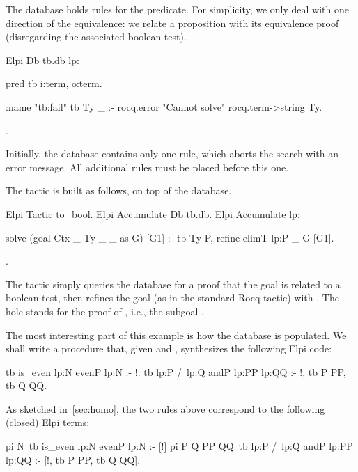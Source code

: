 \documentclass[a4paper, 11pt]{book}
\begin{document}
The database holds rules for the  predicate. For simplicity, we only
deal with one direction of the equivalence: we relate a proposition with its
equivalence proof (disregarding the associated boolean test).

\begin{rocqcode}
Elpi Db tb.db lp:{{

pred tb i:term, o:term.

:name "tb:fail"
tb Ty _ :- rocq.error "Cannot solve" {rocq.term->string Ty}.

}}.
\end{rocqcode}


Initially, the database contains only one rule, which aborts the search with
an error message. All additional rules must be placed before this one.


The  tactic is built as follows, on top of the database.

\begin{rocqcode}
Elpi Tactic to_bool.
Elpi Accumulate Db tb.db.
Elpi Accumulate lp:{{

solve (goal Ctx _ Ty _ _ as G) [G1] :-
  tb Ty P,
  refine {{ elimT lp:P _ }} G [G1].

}}.
\end{rocqcode}


The tactic simply queries the database for a proof  that the goal is
related to a boolean test, then refines the goal (as in the standard Rocq
 tactic) with . The hole stands for the proof
of , i.e., the subgoal .


The most interesting part of this example is how the database is populated.
We shall write a  procedure that, given  and
, synthesizes the following Elpi code:

\begin{elpicode}
tb {{ is_even lp:N }} {{ evenP lp:N }} :- !.
tb {{ lp:P /\ lp:Q }} {{ andP lp:PP lp:QQ }} :- !, tb P PP, tb Q QQ.
\end{elpicode}


As sketched in~\cref{sec:homo}, the two rules above correspond to the
following (closed) Elpi terms:

\begin{elpicode}
pi N\ tb {{ is_even lp:N }} {{ evenP lp:N }} :- [!]
pi P Q PP QQ\ tb {{ lp:P /\ lp:Q }} {{ andP lp:PP lp:QQ }} :-
  [!, tb P PP, tb Q QQ].
\end{elpicode}
\end{document}
